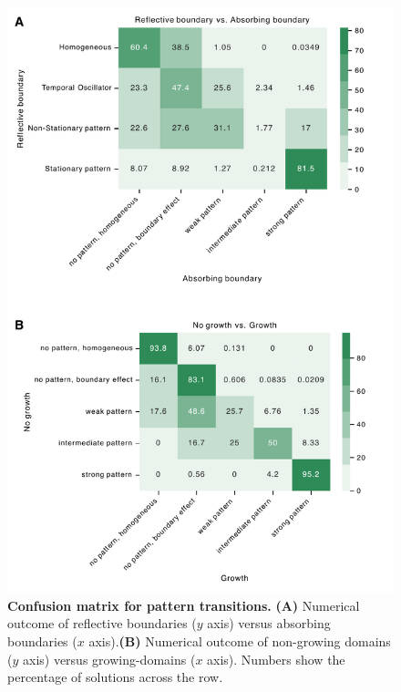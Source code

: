 \documentclass[10pt,letterpaper]{article}
\begin{document}
\begin{figure}[H]
    \includegraphics[width=1\textwidth]{figures/sup_confusion_matrix}

    \caption{{\bf Confusion matrix for pattern transitions.} \textbf{(A)} Numerical outcome of reflective boundaries ($y$ axis) versus absorbing boundaries ($x$ axis).\textbf{(B)} Numerical outcome of non-growing domains ($y$ axis) versus growing-domains ($x$ axis). Numbers show the percentage of solutions across the row.}

    \label{sup_fig5}
\end{figure}
\end{document}
